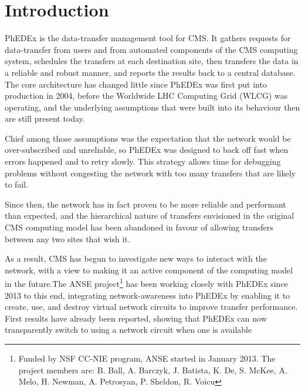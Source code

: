 \section{Introduction}

PhEDEx\cite{PhEDEx} is the data-transfer management tool for CMS. It gathers requests for data-transfer from users and from automated components of the CMS computing system, schedules the transfers at each destination site, then transfers the data in a reliable and robust manner, and reports the results back to a central database. The core architecture has changed little since PhEDEx was first put into production in 2004, before the Worldwide LHC Computing Grid (WLCG\cite{WLCG}) was operating, and the underlying assumptions that were built into its behaviour then are still present today.

Chief among those assumptions was the expectation that the network would be over-subscribed and unreliable, so PhEDEx was designed to back off fast when errors happened and to retry slowly. This strategy allows time for debugging problems without congesting the network with too many transfers that are likely to fail.

Since then, the network has in fact proven to be more reliable and performant than expected, and the hierarchical nature of transfers envisioned in the original CMS computing model\cite{CompModel} has been abandoned in favour of allowing transfers between any two sites that wish it\cite{T2Traffic}.

As a result, CMS has begun to investigate new ways to interact with the network, with a view to making it an active component of the computing model in the future\cite{NetworkAwarenessinCMS}.The ANSE project\footnote{Funded by NSF CC-NIE program, ANSE started in January 2013. The project members are: B. Ball, A. Barczyk, J. Batista, K. De, S. McKee, A. Melo, H. Newman, A. Petrosyan, P. Sheldon, R. Voicu} has been working closely with PhEDEx since 2013 to this end, integrating network-awareness into PhEDEx by enabling it to create, use, and destroy virtual network circuits to improve transfer performance. First results have already been reported, showing that PhEDEx can now transparently switch to using a network circuit when one is available\cite{ANSE_ISGC_2014}